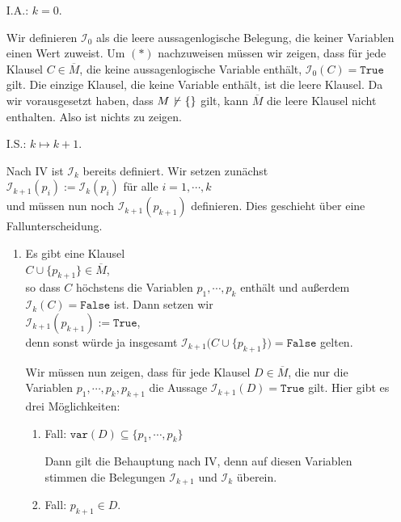 \begin{enumerate}
\item[I.A.:] $k=0$.
 
  Wir definieren $\mathcal{I}_0$ als die leere aussagenlogische Belegung, die keiner
  Variablen einen Wert zuweist.  Um $(*)$ nachzuweisen müssen wir zeigen, dass für jede Klausel $C \in \overline{M}$, die
  keine aussagenlogische Variable enthält, $\mathcal{I}_0(C) = \mathtt{True}$ gilt.  Die einzige Klausel, die
  keine Variable enthält, ist die leere Klausel.  Da wir vorausgesetzt haben, dass  $M \not\,\vdash \{\}$
  gilt, kann $\overline{M}$ die leere Klausel nicht enthalten.  Also ist nichts zu zeigen.
\item[I.S.:] $k \mapsto k+1$.

  Nach IV ist $\mathcal{I}_k$ bereits definiert.  Wir setzen zunächst
  \\[0.2cm]
  \hspace*{1.3cm}
  $\mathcal{I}_{k+1}(p_i) := \mathcal{I}_k(p_i)$ \quad für alle $i=1,\cdots,k$
  \\[0.2cm]
  und müssen nun noch $\mathcal{I}_{k+1}(p_{k+1})$ definieren.  Dies geschieht über eine Fallunterscheidung.
  \begin{enumerate}
  \item Es gibt eine Klausel
    \\[0.2cm]
    \hspace*{1.3cm}
    $C \cup \{p_{k+1}\} \in \overline{M}$,
    \\[0.2cm]
    so dass $C$ höchstens die Variablen $p_1,\cdots,p_k$ enthält und außerdem $\mathcal{I}_k(C) = \mathtt{False}$
    ist.  Dann setzen wir
    \\[0.2cm]
    \hspace*{1.3cm}
    $\mathcal{I}_{k+1}(p_{k+1}) := \mathtt{True}$,
    \\[0.2cm]    
    denn sonst würde ja insgesamt $\mathcal{I}_{k+1}\bigl(C \cup \{p_{k+1}\}\bigr) = \mathtt{False}$ gelten. 

    Wir müssen nun zeigen, dass für jede Klausel $D \in \overline{M}$, die nur die Variablen
    $p_1,\cdots,p_k,p_{k+1}$ die Aussage $\mathcal{I}_{k+1}(D) = \mathtt{True}$ gilt.  Hier gibt es drei
    Möglichkeiten:
    \begin{enumerate}[1.]
    \item Fall: $\mathtt{var}(D) \subseteq \{p_1,\cdots,p_k\}$

          Dann gilt die Behauptung nach IV, denn auf diesen Variablen stimmen die Belegungen
          $\mathcal{I}_{k+1}$ und $\mathcal{I}_k$ überein.
    \item Fall: $p_{k+1} \in D$.
          

\end{enumerate}
\end{enumerate}
\end{enumerate}
